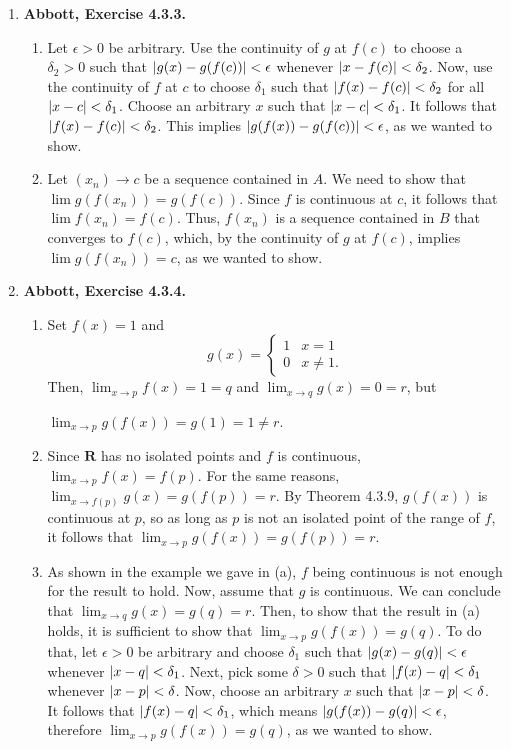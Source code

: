 \documentclass{article}
\DeclarePairedDelimiter\abs{\lvert}{\rvert}
\newcommand{\R}{\mathbf{R}}
\newcommand{\exc}[2][Abbott]{\item \textbf{#1, Exercise #2.}}
\newcommand{\lep}[1][L]{#1et $\epsilon > 0$ be arbitrary}
\begin{document}
\begin{enumerate}
\begin{enumerate}
    \end{enumerate}
    
    \exc{4.3.3}
    \begin{enumerate}
        \item \lep. Use the continuity of $g$ at $f(c)$ to choose a $\delta_2 > 0$ such that $\abs{g(x)-g(f(c))} < \epsilon$ whenever $\abs{x-f(c)} < \delta_2$. Now, use the continuity of $f$ at $c$ to choose $\delta_1$ such that $\abs{f(x)-f(c)} < \delta_2$ for all $\abs{x-c} < \delta_1$. Choose an arbitrary $x$ such that $\abs{x-c} < \delta_1$. It follows that $\abs{f(x)-f(c)} < \delta_2$. This implies $\abs{g(f(x))-g(f(c))} < \epsilon$, as we wanted to show.
        
        \item Let $(x_n) \to c$ be a sequence contained in $A$. We need to show that $\lim g(f(x_n)) = g(f(c))$. Since $f$ is continuous at $c$, it follows that $\lim f(x_n) = f(c)$. Thus, $f(x_n)$ is a sequence contained in $B$ that converges to $f(c)$, which, by the continuity of $g$ at $f(c)$, implies $\lim g(f(x_n)) = c$, as we wanted to show.
    \end{enumerate}
    
    \exc{4.3.4}
    \begin{enumerate}
        \item Set $f(x) = 1$ and 
        \begin{equation*}
            g(x) = \begin{cases}
            1 & x = 1 \\
            0 & x \neq 1.
            \end{cases}
        \end{equation*} Then, $\lim_{x \to p} f(x) = 1 = q$ and $\lim_{x \to q} g(x) = 0 = r$, but 
        
        \noindent $\lim_{x \to p} g(f(x)) = g(1) = 1 \neq r$.
        
        \item Since $\R$ has no isolated points and $f$ is continuous, $\lim_{x \to p} f(x) = f(p)$. For the same reasons, $\lim_{x \to f(p)} g(x) = g(f(p)) = r$. By Theorem 4.3.9, $g(f(x))$ is continuous at $p$, so as long as $p$ is not an isolated point of the range of $f$, it follows that $\lim_{x \to p} g(f(x)) = g(f(p)) = r$. 
        
        \item As shown in the example we gave in (a), $f$ being continuous is not enough for the result to hold. Now, assume that $g$ is continuous. We can conclude that $\lim_{x \to q} g(x) = g(q) = r$. Then, to show that the result in (a) holds, it is sufficient to show that $\lim_{x \to p} g(f(x)) = g(q)$. To do that, \lep[l] \space and choose $\delta_1$ such that $\abs{g(x)-g(q)} < \epsilon$ whenever $\abs{x-q} < \delta_1$. Next, pick some $\delta > 0$ such that $\abs{f(x)-q} < \delta_1$ whenever $\abs{x-p} < \delta$. Now, choose an arbitrary $x$ such that $\abs{x-p} < \delta$. It follows that $\abs{f(x)-q} < \delta_1$, which means $\abs{g(f(x))-g(q)} < \epsilon$, therefore $\lim_{x \to p} g(f(x)) = g(q)$, as we wanted to show.
    \end{enumerate}
    

\end{enumerate}
\end{document}
